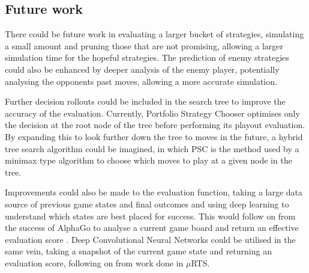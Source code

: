 \documentclass[]{article}
\begin{document}
\subsection{Future work}
 

There could be future work in evaluating a larger bucket of strategies, simulating a small amount and pruning those that are not promising, allowing a larger simulation time for the hopeful strategies. The prediction of enemy strategies could also be enhanced by deeper analysis of the enemy player, potentially analysing the opponents past moves, allowing a more accurate simulation. 

Further decision rollouts could be included in the search tree to improve the accuracy of the evaluation. Currently, Portfolio Strategy Chooser optimises only the decision at the root node of the tree before performing its playout evaluation. By expanding this to look further down the tree to moves in the future, a hybrid tree search algorithm could be imagined, in which PSC is the method used by a minimax type algorithm to choose which moves to play at a given node in the tree.

Improvements could also be made to the evaluation function, taking a large data source of previous game states and final outcomes and using deep learning to understand which states are best placed for success. This would follow on from the success of AlphaGo to analyse a current game board and return an effective evaluation score \cite{silver2016mastering}. Deep Convolutional Neural Networks could be utilised in the same vein, taking a snapshot of the current game state and returning an evaluation score, following on from work done in $\mu$RTS\cite{barriga2017combining}.



\end{document}
